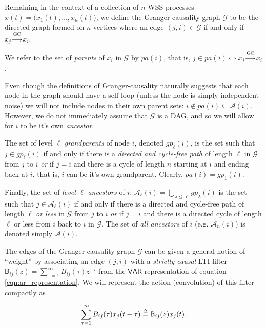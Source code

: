 \documentclass[12pt]{article}
\def\gc{\overset{\text{GC}}{\rightarrow}}  %
\def\gcg{\mathcal{G}}  %
\def\VAR{\mathsf{VAR}}  %
\def\B{\mathsf{B}}  %
\newcommand{\pa}[1]{pa(#1)}  %
\newcommand{\anc}[1]{\mathcal{A}(#1)}  %
\newcommand{\ancn}[2]{\mathcal{A}_{#1}(#2)}  %
\newcommand{\gpn}[2]{gp_{#1}(#2)}  %
\begin{document}
\begin{definition}

Remaining in the context of a collection of $n$ WSS processes
$x(t) = \big(x_1(t), \ldots, x_n(t)\big)$, we define the Granger-causality
graph $\gcg$ to be the directed graph formed on $n$ vertices where an
edge $(j, i) \in \gcg$ if and only if $x_j \gc x_i$.

We refer to the set of \textit{parents} of $x_i$ in $\gcg$ by
$\pa{i}$, that is, $j \in \pa{i} \iff x_j \gc x_i$.

Even though the definitions of Granger-causality naturally suggests
that each node in the graph should have a self-loop (unless the node
is simply independent noise) we will not include nodes in their own
parent sets: $i \not\in \pa{i} \subseteq \anc{i}$.  However, we do not
immediately assume that $\gcg$ is a DAG, and so we will allow for $i$
to be it's own \textit{ancestor}.

The set of level $\ell$ \textit{grandparents} of node $i$, denoted
$\gpn{\ell}{i}$, is the set such that $j \in \gpn{\ell}{i}$ if and only if
there is a \textit{directed and cycle-free path} of length $\ell$ in
$\gcg$ from $j$ to $i$ \textit{or} if $j = i$ and there is a cycle of
length $n$ starting at $i$ and ending back at $i$, that is, $i$ can be
it's own grandparent.  Clearly, $\pa{i} = \gpn{1}{i}$.

Finally, the set of \textit{level $\ell$ ancestors} of
$i$: $\ancn{\ell}{i} = \bigcup_{\lambda \le \ell}\gpn{\lambda}{i}$ is the set such that
$j \in \ancn{\ell}{i}$ if and only if there is a directed and cycle-free
path of length $\ell$ \textit{or less} in $\gcg$ from $j$ to $i$
\textit{or} if $j = i$ and there is a directed cycle of length $\ell$ or
less from $i$ back to $i$ in $\gcg$.  The set of \textit{all
  ancestors} of $i$ (e.g. $\ancn{n}{i}$) is denoted simply $\anc{i}$.
\end{definition}

The edges of the Granger-causality graph $\gcg$ can be given a general
notion of ``weight'' by associating an edge $(j, i)$ with a
\textit{strictly causal} LTI filter
$\B_{ij}(z) = \sum_{\tau = 1}^{\infty} B_{ij}(\tau)z^{-\tau}$ from the
$\VAR$ representation of equation \ref{eqn:ar_representation}.  We
will represent the action (convolution) of this filter compactly as

\begin{equation}
  \sum_{\tau = 1}^\infty B_{ij}(\tau)x_j(t - \tau) \defeq \B_{ij}(z)x_j(t).
\end{equation}
\end{document}
